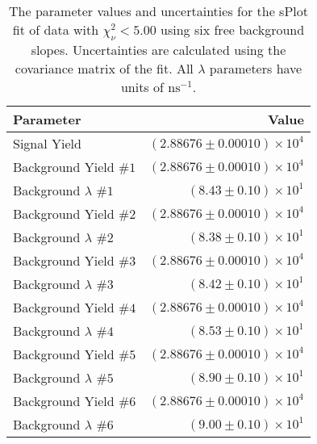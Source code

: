 
\begin{table}[ht]
    \begin{center}
        \begin{tabular}{lr}\toprule
            Parameter & Value \\\midrule
            Signal Yield & $(2.88676 \pm 0.00010) \times 10^{4}$ \\
            Background Yield $\#1$ & $(2.88676 \pm 0.00010) \times 10^{4}$ \\
            Background $\lambda$ $\#1$ & $(8.43 \pm 0.10) \times 10^{1}$ \\
            Background Yield $\#2$ & $(2.88676 \pm 0.00010) \times 10^{4}$ \\
            Background $\lambda$ $\#2$ & $(8.38 \pm 0.10) \times 10^{1}$ \\
            Background Yield $\#3$ & $(2.88676 \pm 0.00010) \times 10^{4}$ \\
            Background $\lambda$ $\#3$ & $(8.42 \pm 0.10) \times 10^{1}$ \\
            Background Yield $\#4$ & $(2.88676 \pm 0.00010) \times 10^{4}$ \\
            Background $\lambda$ $\#4$ & $(8.53 \pm 0.10) \times 10^{1}$ \\
            Background Yield $\#5$ & $(2.88676 \pm 0.00010) \times 10^{4}$ \\
            Background $\lambda$ $\#5$ & $(8.90 \pm 0.10) \times 10^{1}$ \\
            Background Yield $\#6$ & $(2.88676 \pm 0.00010) \times 10^{4}$ \\
            Background $\lambda$ $\#6$ & $(9.00 \pm 0.10) \times 10^{1}$ \\\bottomrule
        \end{tabular}
        \caption{The parameter values and uncertainties for the sPlot fit of data with $\chi^2_\nu < 5.00$ using six free background slopes. Uncertainties are calculated using the covariance matrix of the fit. All $\lambda$ parameters have units of $\si{\nano\second}^{-1}$.}\label{tab:splot-fit-results-chisqdof-5.00-free-6}
    \end{center}
\end{table}
